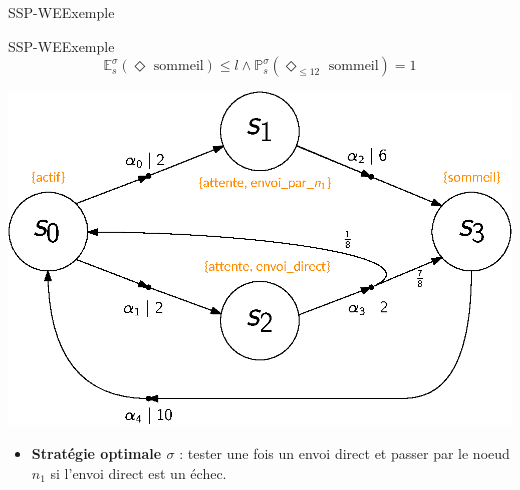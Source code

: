 \documentclass[compress]{beamer}
\begin{document}
\begin{frame}{SSP-WE}{Exemple}
\end{frame}

\begin{frame}{SSP-WE}{Exemple}
    \vspace{-0.05\linewidth}
    \[ \mathbb{E}^{\sigma}_s(\Diamond \text{ sommeil}) \leq l \wedge \mathbb{P}^\sigma_s(\Diamond_{\leq 12} \text{ sommeil}) = 1 \]
    \begin{center}
      \includegraphics[width=0.6\linewidth]{resources/main-mdp3}
    \end{center}
    \vspace{-0.05\linewidth}
    \begin{itemize}
      \item \textbf{\color{fibeamer@orange}Stratégie optimale $\sigma$} : tester une fois un envoi direct et passer par le noeud $n_1$ si l'envoi direct est un échec.
    \end{itemize}
\end{frame}
\end{document}
